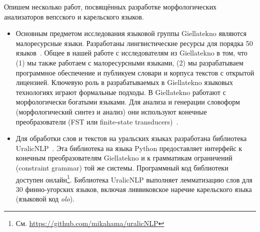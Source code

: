 Опишем несколько работ, посвящённых разработке морфологических анализаторов вепсского и карельского языков.
\begin{itemize}
  \item Основным предметом исследования языковой группы Giellatekno 
      являются малоресурсные языки.  
        Разработаны лингвистические ресурсы 
        для порядка 50 языков~\cite{Moshagen2014}. 
        Общее в нашей работе с исследователям из Giellatekno в том, что 
        (1) мы также работаем с малоресурсными языками, 
        (2) мы разрабатываем программное обеспечение 
        и публикуем словари и корпуса текстов с открытой лицензией.
      Ключевую роль в разрабатываемых в Giellatekno языковых технологиях 
        играют формальные подходы. 
        В Giellatekno работают с морфологически богатыми языками.
        Для анализа и генерации словоформ (морфологический синтез и анализ) 
        они используют конечные преобразователи 
        (FST или finite-state transducers)~\cite{Moshagen2014}. 
% 
  \item Для обработки слов и текстов на уральских языках разработана 
      библиотека UralicNLP~\cite{UralicNLP2019Hamalainen}. 
        Эта библиотека на языка Python предоставляет интерфейс 
        к конечным преобразователям Giellatekno 
        и к грамматикам ограничений (constraint grammar) той же системы. 
        Программный код библиотеки доступен 
        онлайн\footnote{См. \url{https://github.com/mikahama/uralicNLP}}.
        Библиотека UralicNLP выполняет лемматизацию слов 
        для 30 финно-угорских языков, включая 
        ливвиковское наречие карельского языка (языковой код \textit{olo}).
\end{itemize}





